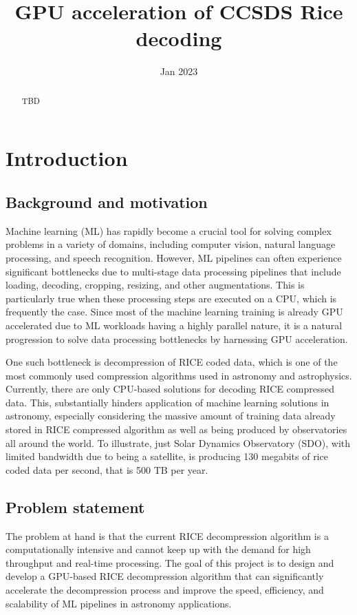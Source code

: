 \documentclass[licencjacka,en]{pracamgr}
\title{GPU acceleration of CCSDS Rice decoding}
\date{Jan 2023}
\begin{document}
\maketitle

\begin{abstract}
	TBD
\end{abstract}

\tableofcontents

\chapter{Introduction}
\section{Background and motivation}
Machine learning (ML) has rapidly become a crucial tool for solving complex problems in a variety of domains, including computer vision, natural language processing, and speech recognition. However, ML pipelines can often experience significant bottlenecks due to multi-stage data processing pipelines that include loading, decoding, cropping, resizing, and other augmentations. This is particularly true when these processing steps are executed on a CPU, which is frequently the case. Since most of the machine learning training is already GPU accelerated due to ML workloads having a highly parallel nature, it is a natural progression to solve data processing bottlenecks by harnessing GPU acceleration.

One such bottleneck is decompression of RICE coded data, which is one of the most commonly used compression algorithms used in astronomy and astrophysics. Currently, there are only CPU-based solutions for decoding RICE compressed data. This, substantially hinders application of machine learning solutions in astronomy, especially considering the massive amount of training data already stored in RICE compressed algorithm as well as being produced by observatories all around the world. To illustrate, just Solar Dynamics Observatory (SDO), with limited bandwidth due to being a satellite, is producing 130 megabits of rice coded data per second, that is 500 TB per year.

\section{Problem statement}
The problem at hand is that the current RICE decompression algorithm is a computationally intensive and cannot keep up with the demand for high throughput and real-time processing. The goal of this project is to design and develop a GPU-based RICE decompression algorithm that can significantly accelerate the decompression process and improve the speed, efficiency, and scalability of ML pipelines in astronomy applications.
\end{document}
